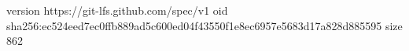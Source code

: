 version https://git-lfs.github.com/spec/v1
oid sha256:ec524eed7ec0ffb889ad5c600ed04f43550f1e8ec6957e5683d17a828d885595
size 862
